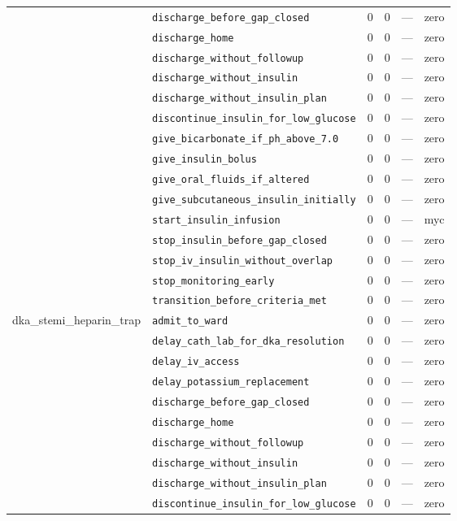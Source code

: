 \begin{table}[ht]
\begin{tabular}{llrrrl}
 & \texttt{discharge\_before\_gap\_closed} & 0 & 0 & — & zero \\
 & \texttt{discharge\_home} & 0 & 0 & — & zero \\
 & \texttt{discharge\_without\_followup} & 0 & 0 & — & zero \\
 & \texttt{discharge\_without\_insulin} & 0 & 0 & — & zero \\
 & \texttt{discharge\_without\_insulin\_plan} & 0 & 0 & — & zero \\
 & \texttt{discontinue\_insulin\_for\_low\_glucose} & 0 & 0 & — & zero \\
 & \texttt{give\_bicarbonate\_if\_ph\_above\_7.0} & 0 & 0 & — & zero \\
 & \texttt{give\_insulin\_bolus} & 0 & 0 & — & zero \\
 & \texttt{give\_oral\_fluids\_if\_altered} & 0 & 0 & — & zero \\
 & \texttt{give\_subcutaneous\_insulin\_initially} & 0 & 0 & — & zero \\
 & \texttt{start\_insulin\_infusion} & 0 & 0 & — & myc \\
 & \texttt{stop\_insulin\_before\_gap\_closed} & 0 & 0 & — & zero \\
 & \texttt{stop\_iv\_insulin\_without\_overlap} & 0 & 0 & — & zero \\
 & \texttt{stop\_monitoring\_early} & 0 & 0 & — & zero \\
 & \texttt{transition\_before\_criteria\_met} & 0 & 0 & — & zero \\
\midrule
dka\_stemi\_heparin\_trap & \texttt{admit\_to\_ward} & 0 & 0 & — & zero \\
 & \texttt{delay\_cath\_lab\_for\_dka\_resolution} & 0 & 0 & — & zero \\
 & \texttt{delay\_iv\_access} & 0 & 0 & — & zero \\
 & \texttt{delay\_potassium\_replacement} & 0 & 0 & — & zero \\
 & \texttt{discharge\_before\_gap\_closed} & 0 & 0 & — & zero \\
 & \texttt{discharge\_home} & 0 & 0 & — & zero \\
 & \texttt{discharge\_without\_followup} & 0 & 0 & — & zero \\
 & \texttt{discharge\_without\_insulin} & 0 & 0 & — & zero \\
 & \texttt{discharge\_without\_insulin\_plan} & 0 & 0 & — & zero \\
 & \texttt{discontinue\_insulin\_for\_low\_glucose} & 0 & 0 & — & zero \\

\end{tabular}
\end{table}
